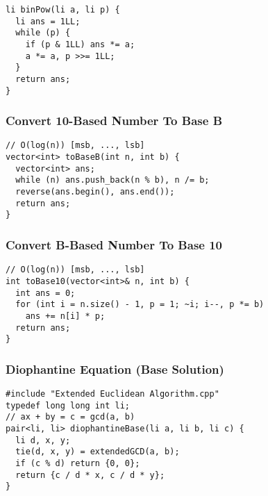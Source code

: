 \documentclass[twoside]{article}
\newcommand{\fileTitleStyle}{\large\underline}
\begin{document}
\begin{multicols*}{2}
\begin{verbatim}
li binPow(li a, li p) {
  li ans = 1LL;
  while (p) {
    if (p & 1LL) ans *= a;
    a *= a, p >>= 1LL;
  }
  return ans;
}
\end{verbatim}

\subsubsectionfont{\centering\bfseries\Large}
\subsubsectionfont{\fileTitleStyle}
\subsubsection*{Convert 10-Based Number To Base B}
\begin{verbatim}
// O(log(n)) [msb, ..., lsb]
vector<int> toBaseB(int n, int b) {
  vector<int> ans;
  while (n) ans.push_back(n % b), n /= b;
  reverse(ans.begin(), ans.end());
  return ans;
}
\end{verbatim}

\subsubsectionfont{\centering\bfseries\Large}
\subsubsectionfont{\fileTitleStyle}
\subsubsection*{Convert B-Based Number To Base 10}
\begin{verbatim}
// O(log(n)) [msb, ..., lsb]
int toBase10(vector<int>& n, int b) {
  int ans = 0;
  for (int i = n.size() - 1, p = 1; ~i; i--, p *= b)
    ans += n[i] * p;
  return ans;
}
\end{verbatim}

\subsubsectionfont{\centering\bfseries\Large}
\subsubsectionfont{\fileTitleStyle}
\subsubsection*{Diophantine Equation (Base Solution)}
\begin{verbatim}
#include "Extended Euclidean Algorithm.cpp"
typedef long long int li;
// ax + by = c = gcd(a, b)
pair<li, li> diophantineBase(li a, li b, li c) {
  li d, x, y;
  tie(d, x, y) = extendedGCD(a, b);
  if (c % d) return {0, 0};
  return {c / d * x, c / d * y};
}
\end{verbatim}

\subsubsectionfont{\centering\bfseries\Large}
\subsubsectionfont{\fileTitleStyle}

\end{multicols*}
\end{document}
